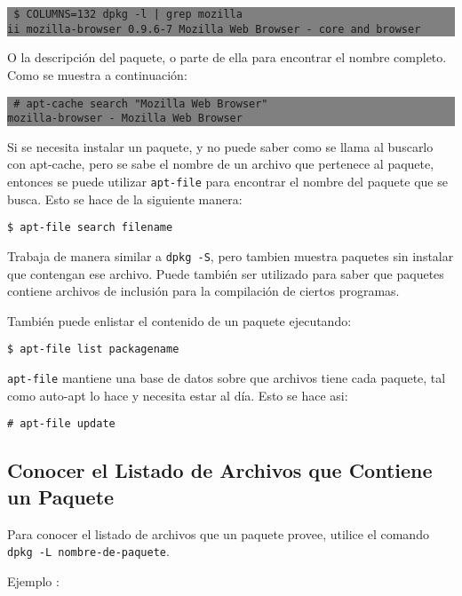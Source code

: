 \documentclass[12pt]{article}
\begin{document}
\colorbox{grey}{\parbox[t]{0.95\linewidth}{ \vspace*{0.5cm} {\tt
     \$ COLUMNS=132 dpkg -l | grep mozilla \\
     ii  mozilla-browser             0.9.6-7                     Mozilla Web Browser - core and browser \\
 } \vspace*{0.5cm} } } 

O la descripción del paquete, o parte de ella para encontrar el nombre completo. Como se muestra a continuación:

\colorbox{grey}{\parbox[t]{0.95\linewidth}{ \vspace*{0.5cm} {\tt
     \# apt-cache search "Mozilla Web Browser" \\
     mozilla-browser - Mozilla Web Browser \\
 } \vspace*{0.5cm} } } 



Si se necesita instalar un paquete, y no puede saber como se llama al buscarlo con apt-cache, pero se sabe el nombre de un archivo que pertenece al paquete, entonces se puede utilizar \texttt{apt-file} para encontrar el nombre del paquete que se busca. Esto se hace de la siguiente manera:

{\tt     \$ apt-file search filename}

Trabaja de manera similar a \texttt{dpkg -S}, pero tambien muestra paquetes sin instalar que contengan ese archivo. Puede también ser utilizado para saber que paquetes contiene archivos de inclusión para la compilación de ciertos programas.

También puede enlistar el contenido de un paquete ejecutando:

   {\tt  \$ apt-file list packagename}

\texttt{apt-file} mantiene una base de datos sobre que archivos tiene cada paquete, tal como auto-apt lo hace y necesita estar al día. Esto se hace asi:

     {\tt\# apt-file update}


\subsection*{Conocer el Listado de Archivos que Contiene un Paquete}


Para conocer el listado de archivos que un paquete provee, utilice el comando \texttt{dpkg -L nombre-de-paquete}.


Ejemplo :
\end{document}
